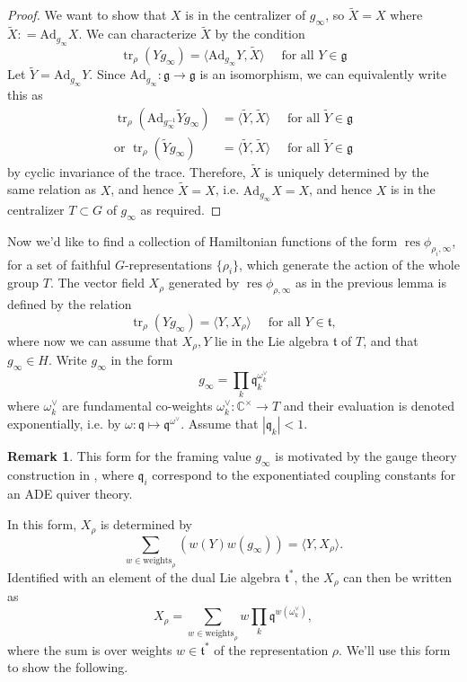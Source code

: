 \documentclass[11pt, oneside, reqno]{amsart}
\theoremstyle{definition} \newtheorem{definition}{Definition}[section]
\theoremstyle{definition} \newtheorem{remark}[definition]{Remark}
\theoremstyle{definition} \newtheorem{remarks}[definition]{Remarks}
\theoremstyle{definition} \newtheorem{question}[definition]{Question}
\theoremstyle{definition} \newtheorem*{note}{Note}
\theoremstyle{definition} \newtheorem{example}[definition]{Example}
\theoremstyle{definition} \newtheorem{examples}[definition]{Examples}
\renewcommand{\gg}{\mathfrak{g}}
\newcommand{\qq}{\mathfrak{q}}
\newcommand{\mr}[1]{\mathrm{#1}}
\newcommand{\mf}[1]{\mathfrak{#1}}
\DeclareMathOperator{\tr}{tr}
\DeclareMathOperator{\res}{res}
\newcommand{\Ad}{\mr{Ad}}
\begin{document}
\begin{proof}
We want to show that $X$ is in the centralizer of $g_\infty$, so $\tilde X = X$
where $\tilde X: = \Ad_{g_\infty} X$. We can characterize $\tilde X$ by the condition
\begin{equation}
  \tr_{\rho}(Y g_\infty)  = \langle \Ad_{g_\infty} Y, \tilde X \rangle \quad \text{ for all } Y \in \gg
\end{equation}
Let $\tilde Y =  \Ad_{g_\infty} Y$.  Since $\Ad_{g_\infty}: \gg \to \gg$ is an isomorphism, we can equivalently write this as
\begin{align*}
  \tr_{\rho}(\Ad_{g_\infty^{-1}} \tilde Y g_\infty)  &= \langle \tilde Y, \tilde X \rangle \quad \text{ for all } \tilde Y \in \gg\\
  \text{or } \tr_\rho(\tilde Y g_\infty) &= \langle \tilde Y, \tilde X \rangle \quad \text{ for all } \tilde Y \in \gg
\end{align*}
by cyclic invariance of the trace. Therefore, $\tilde X$ is uniquely determined by the same relation as $X$, and hence $\tilde X = X$, i.e. $\Ad_{g_\infty} X = X$, and hence $X$ is in the centralizer $T \subset G$ of $g_\infty$ as required. 
\end{proof}

Now we'd like to find a collection of Hamiltonian functions of the form $\res \phi_{\rho_i, \infty}$, for a set of faithful $G$-representations $\{ \rho_i \}$, which generate the action of the whole group $T$.  The vector field $X_\rho$ generated by $\res \phi_{\rho, \infty}$ as in the previous lemma is
defined by the relation 
\[\tr_{\rho}(Y g_\infty)  = \langle Y, X_\rho \rangle \quad \text{ for all } Y \in \mf t,\]
where now we can assume that $X_\rho, Y$ lie in the Lie algebra $\mf t$ of $T$, and that $g_\infty \in H$.  Write $g_\infty$
  in the form
\[g_\infty =   \prod_{k} \qq_k ^{\omega_k^{\vee}}\]
where $\omega_k^{\vee}$ are fundamental co-weights $\omega_{k}^{\vee} \colon \mathbb{C}^{\times} \to T$
and their evaluation is denoted exponentially, i.e. by $\omega \colon \qq \mapsto \qq^{\omega^{\vee}}$. Assume that $|\qq_k | < 1$. 

\begin{remark}
This form for the framing value $g_\infty$ is motivated by the gauge theory construction in \cite{NekrasovPestun}, where $\qq_i$ correspond to the exponentiated coupling constants for an ADE quiver theory.
\end{remark}

In this form, $X_\rho$ is determined by
\[\sum_{w \in \mathrm{weights}_{\rho}}(w(Y) w(g_\infty))  = \langle Y, X_\rho \rangle .\]
 Identified with an element of the dual Lie algebra $\mf t^{*}$, the $X_\rho$ can then be written as
  \begin{equation}
\label{eq:Xrho}
    X_{\rho} = \sum_{w \in \mathrm{weights}_{\rho}} w   \prod_{k} \qq^{w(\omega_k^{\vee})},
\end{equation}
 where the sum is over weights $w \in \mf t^{*}$ of the representation $\rho$.  We'll use this form to show the following.
\end{document}
